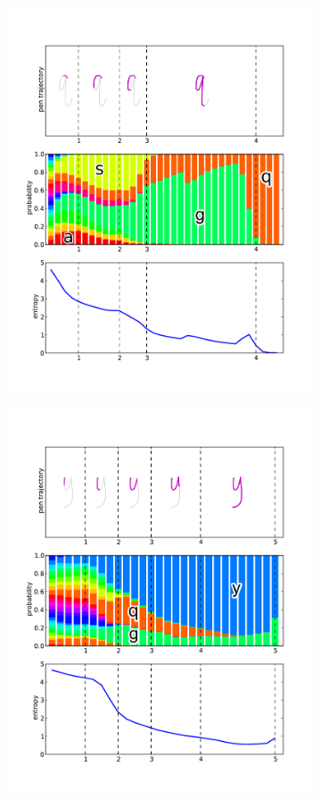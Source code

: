 \documentclass{sigchi}
\begin{document}
\begin{figure}
\begin{subfigure}[b]{0.25\textwidth}
    \includegraphics[width=\textwidth]{figures/entropy_q.pdf}
    \caption{}
    \label{fig:entropy_q}
  \end{subfigure}
  \begin{subfigure}[b]{0.25\textwidth}
    \includegraphics[width=\textwidth]{figures/entropy_y.pdf}

\end{subfigure}
\end{figure}
\end{document}

